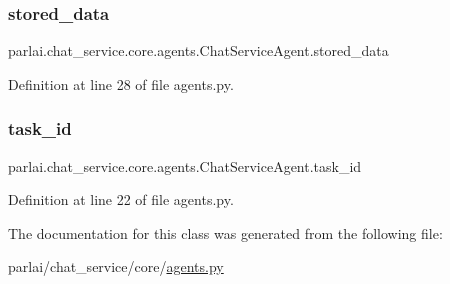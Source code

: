 \subsubsection{\texorpdfstring{stored\+\_\+data}{stored\_data}}
{\footnotesize\ttfamily parlai.\+chat\+\_\+service.\+core.\+agents.\+Chat\+Service\+Agent.\+stored\+\_\+data}



Definition at line 28 of file agents.\+py.

\mbox{\label{classparlai_1_1chat__service_1_1core_1_1agents_1_1ChatServiceAgent_a1f1f978765ae81ca5ec8d04d14575386}} 
\subsubsection{\texorpdfstring{task\+\_\+id}{task\_id}}
{\footnotesize\ttfamily parlai.\+chat\+\_\+service.\+core.\+agents.\+Chat\+Service\+Agent.\+task\+\_\+id}



Definition at line 22 of file agents.\+py.



The documentation for this class was generated from the following file\+:\begin{DoxyCompactItemize}
\item 
parlai/chat\+\_\+service/core/\hyperlink{parlai_2chat__service_2core_2agents_8py}{agents.\+py}\end{DoxyCompactItemize}

